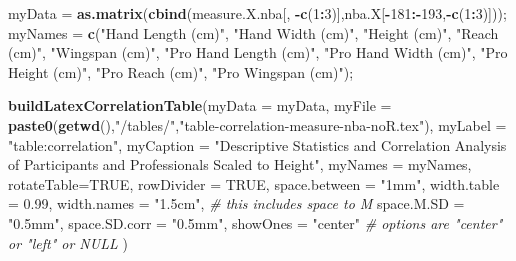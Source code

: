 \documentclass[]{article}
\newenvironment{Shaded}{\begin{snugshade}}{\end{snugshade}}
\newcommand{\CommentTok}[1]{\textcolor[rgb]{0.56,0.35,0.01}{\textit{#1}}}
\newcommand{\DataTypeTok}[1]{\textcolor[rgb]{0.13,0.29,0.53}{#1}}
\newcommand{\DecValTok}[1]{\textcolor[rgb]{0.00,0.00,0.81}{#1}}
\newcommand{\FloatTok}[1]{\textcolor[rgb]{0.00,0.00,0.81}{#1}}
\newcommand{\KeywordTok}[1]{\textcolor[rgb]{0.13,0.29,0.53}{\textbf{#1}}}
\newcommand{\NormalTok}[1]{#1}
\newcommand{\OperatorTok}[1]{\textcolor[rgb]{0.81,0.36,0.00}{\textbf{#1}}}
\newcommand{\OtherTok}[1]{\textcolor[rgb]{0.56,0.35,0.01}{#1}}
\newcommand{\StringTok}[1]{\textcolor[rgb]{0.31,0.60,0.02}{#1}}
\begin{document}
\begin{Shaded}
\begin{Highlighting}[]
\NormalTok{myData =}\StringTok{ }\KeywordTok{as.matrix}\NormalTok{(}\KeywordTok{cbind}\NormalTok{(measure.X.nba[, }\OperatorTok{-}\KeywordTok{c}\NormalTok{(}\DecValTok{1}\OperatorTok{:}\DecValTok{3}\NormalTok{)],nba.X[}\OperatorTok{-}\DecValTok{181}\OperatorTok{:-}\DecValTok{193}\NormalTok{,}\OperatorTok{-}\KeywordTok{c}\NormalTok{(}\DecValTok{1}\OperatorTok{:}\DecValTok{3}\NormalTok{)]));}
\NormalTok{myNames =}\StringTok{ }\KeywordTok{c}\NormalTok{(}\StringTok{"Hand Length (cm)"}\NormalTok{, }\StringTok{"Hand Width (cm)"}\NormalTok{,  }
            \StringTok{"Height (cm)"}\NormalTok{, }\StringTok{"Reach (cm)"}\NormalTok{, }\StringTok{"Wingspan (cm)"}\NormalTok{,}
            \StringTok{"Pro Hand Length (cm)"}\NormalTok{, }\StringTok{"Pro Hand Width (cm)"}\NormalTok{, }
            \StringTok{"Pro Height (cm)"}\NormalTok{, }\StringTok{"Pro Reach (cm)"}\NormalTok{, }\StringTok{"Pro Wingspan (cm)"}\NormalTok{);}


\KeywordTok{buildLatexCorrelationTable}\NormalTok{(}\DataTypeTok{myData =}\NormalTok{ myData, }
                                \DataTypeTok{myFile =} \KeywordTok{paste0}\NormalTok{(}\KeywordTok{getwd}\NormalTok{(),}\StringTok{"/tables/"}\NormalTok{,}\StringTok{"table-correlation-measure-nba-noR.tex"}\NormalTok{),}
                                \DataTypeTok{myLabel =} \StringTok{"table:correlation"}\NormalTok{,}
                                \DataTypeTok{myCaption =} \StringTok{"Descriptive Statistics and Correlation Analysis of Participants and Professionals Scaled to Height"}\NormalTok{,}
                                \DataTypeTok{myNames =}\NormalTok{ myNames,}
                                \DataTypeTok{rotateTable=}\OtherTok{TRUE}\NormalTok{,}
                                \DataTypeTok{rowDivider =} \OtherTok{TRUE}\NormalTok{,}
                                \DataTypeTok{space.between =} \StringTok{"1mm"}\NormalTok{,}
                                \DataTypeTok{width.table =} \FloatTok{0.99}\NormalTok{,}
                                \DataTypeTok{width.names =} \StringTok{"1.5cm"}\NormalTok{, }\CommentTok{# this includes space to M}
                                \DataTypeTok{space.M.SD =} \StringTok{"0.5mm"}\NormalTok{,}
                                \DataTypeTok{space.SD.corr =} \StringTok{"0.5mm"}\NormalTok{,}
                                \DataTypeTok{showOnes =} \StringTok{"center"} \CommentTok{# options are "center" or "left" or NULL}
\NormalTok{                                )}


\end{Highlighting}
\end{Shaded}
\end{document}
